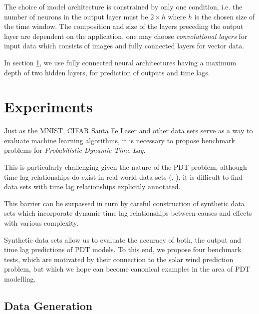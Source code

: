\documentclass[envcountsect,runningheads]{llncs}
\theoremstyle{etoile}
\begin{document}
The choice of model architecture is constrained by only one condition, i.e. the number of neurons 
in the output layer must be $2 \times h$ where $h$ is the chosen size of the time window. 
The composition and size of the layers preceding the output layer are dependent on the application, 
one may choose \emph{convolutional layers} for input data which consists of images and fully connected 
layers for vector data.



In section \ref{sec:exp}, we use fully connected neural architectures having a maximum depth of 
two hidden layers, for prediction of outputs and time lags.

\section{Experiments}\label{sec:exp}


Just as the MNIST, CIFAR Santa Fe Laser and other data sets serve as a way to evaluate machine learning 
algorithms, it is necessary to propose benchmark problems for \emph{Probabilistic Dynamic Time Lag}.

This is particularly challenging given the nature of the PDT problem, although time lag 
relationships do exist in real world data sets (\cite{doi:10.1002/jgra.50429}, \cite{ZHOU2006195}), 
it is difficult to find data sets with time lag relationships explicitly annotated.

This barrier can be surpassed in turn by careful construction of synthetic data sets which incorporate 
dynamic time lag relationships between causes and effects with various complexity.

Synthetic data sets allow us to evaluate the accuracy of both, the output and time lag predictions of 
PDT models. To this end, we propose four benchmark tests, which are motivated by their connection 
to the solar wind prediction problem, but which we hope can become canonical examples in the area 
of PDT modelling.

\subsection{Data Generation}
\end{document}
